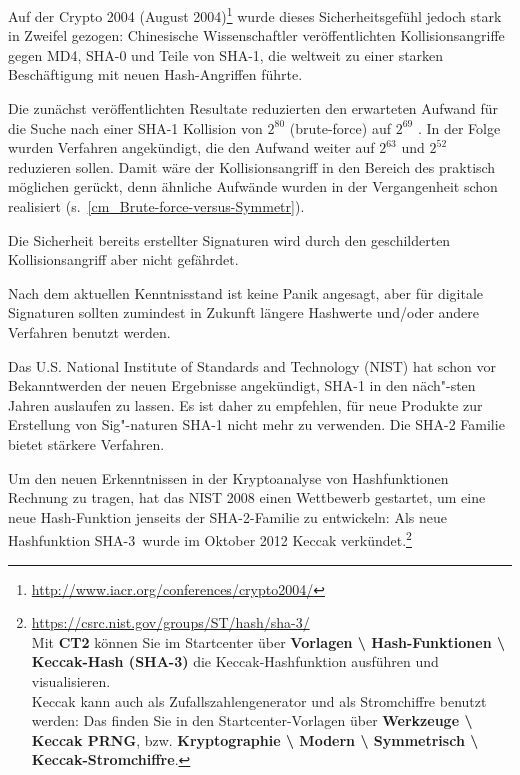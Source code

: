 \begin{refsegment}
Auf der Crypto 2004 (August 2004)\footnote{%
    \url{http://www.iacr.org/conferences/crypto2004/} }
wurde dieses Sicherheitsgefühl jedoch stark in Zweifel gezogen:
Chinesische Wissenschaftler veröffentlichten
Kollisionsangriffe gegen MD4, SHA-0 und Teile von SHA-1, die
weltweit zu einer starken Beschäftigung mit neuen Hash-Angriffen
führte.

Die zunächst veröffentlichten Resultate reduzierten den erwarteten Aufwand für
die Suche nach einer SHA-1 Kollision von $2^{80}$ (brute-force) auf $2^{69}$
\cite{Wang2005}.  In der Folge wurden Verfahren angekündigt, die den Aufwand
weiter auf $2^{63}$ \cite{Wang2005b} und $2^{52}$ \cite{McDonald2009} reduzieren
sollen.  Damit wäre der Kollisionsangriff in den Bereich des praktisch möglichen
gerückt, denn ähnliche Aufwände wurden in der Vergangenheit schon realisiert (s.\
\ref{cm_Brute-force-versus-Symmetr}).

Die Sicherheit bereits erstellter Signaturen wird durch den geschilderten
Kollisionsangriff aber nicht gefährdet.

Nach dem aktuellen Kenntnisstand ist keine Panik angesagt, aber für
digitale Signaturen sollten zumindest in Zukunft längere Hashwerte und/oder
andere Verfahren benutzt werden.

Das U.S. National Institute of Standards and Technology (NIST) hat
schon vor Bekanntwerden der neuen Ergebnisse angekündigt, SHA-1 in den
näch"-sten Jahren auslaufen zu lassen. Es ist daher zu empfehlen, für neue
Produkte zur Erstellung von Sig"-naturen SHA-1 nicht mehr zu verwenden. Die
SHA-2 Familie \cite{FIPS180} bietet stärkere Verfahren.

Um den neuen Erkenntnissen in der Kryptoanalyse von Hashfunktionen Rechnung
zu tragen, hat das NIST 2008 einen Wettbewerb gestartet, um eine neue
Hash-Funktion jenseits der SHA-2-Familie zu entwickeln: Als neue Hashfunktion
\glqq SHA-3\grqq~wurde im Oktober 2012 Keccak\index{Keccak}\index{SHA-3}
verkündet.\footnote{%
\url{https://csrc.nist.gov/groups/ST/hash/sha-3/}\\
    Mit {\bf CT2} können Sie im Startcenter
    über {\bf Vorlagen \textbackslash{} Hash-Funktionen \textbackslash{}
    Keccak-Hash (SHA-3)} die Keccak-Hashfunktion ausführen und visualisieren.\\
    Keccak kann auch als Zufallszahlengenerator und als Stromchiffre benutzt
    werden: Das finden Sie in den Startcenter-Vorlagen über
    {\bf Werkzeuge \textbackslash{} Keccak PRNG}, bzw.
    {\bf Kryptographie \textbackslash{} Modern \textbackslash{} Symmetrisch
         \textbackslash{} Keccak-Stromchiffre}.
}


\end{refsegment}
